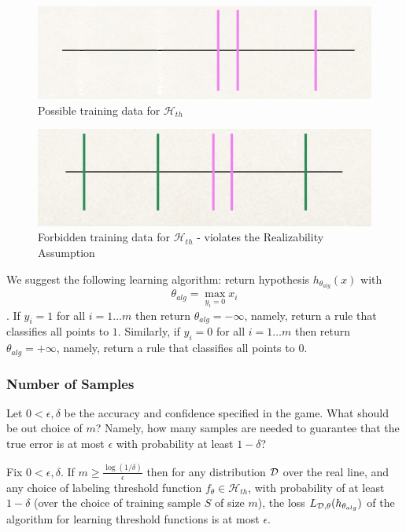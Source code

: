 \documentclass[11pt]{article}
\newcommand{\Hc}{\mathcal{H}}
\begin{document}
\begin{figure}[h!]
\centering
\includegraphics[scale=0.3]{thresholds1b.png}
\caption{Possible training data for $\Hc_{th}$}
\end{figure}

\begin{figure}[h!]
\centering
\includegraphics[scale=0.3]{thresholds2.png}
\caption{Forbidden training data for $\Hc_{th}$ - violates the Realizability Assumption}
\end{figure}


We suggest the following learning algorithm: return hypothesis $h_{\theta_{alg}}(x)$ with $$\theta_{alg} = \max_{y_i=0} x_i$$.
If $y_i=1$ for all $i=1\ldots m$ then return $\theta_{alg} = -\infty$, namely, return a rule that classifies all points to $1$. Similarly, if $y_i=0$ for all $i=1\ldots m$ then return $\theta_{alg} = +\infty$, namely, return a rule that classifies all points to $0$.

\vspace{5mm}

\subsubsection*{Number of Samples}

Let $0<\epsilon,\delta$ be the accuracy and confidence specified in the game.
What should be out choice of $m$? Namely, how many samples are needed to guarantee that the true error is at most $\epsilon$ with probability at least $1-\delta$?

\begin{claim}
Fix $0<\epsilon,\delta$.
If $m \ge \frac{\log(1/\delta)}{\epsilon}$ then for any distribution $\mathcal{D}$ over the real line, and any choice of  labeling threshold function $f_\theta \in \Hc_{th}$,  with probability of at least $1-\delta$ (over the choice of training sample $S$ of size $m$), the loss
$L_{\mathcal{D},\theta}(h_{\theta_{alg}})$
of the algorithm for learning threshold functions is at most $\epsilon.$
\end{claim}
\end{document}

